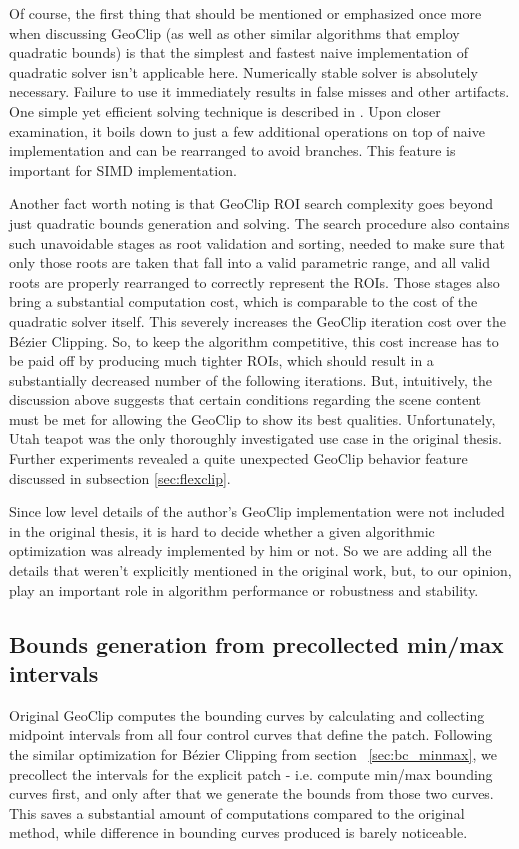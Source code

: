 \documentclass{jcgt}
\begin{document}
Of course, the first thing that should be mentioned or emphasized once more when discussing GeoClip (as well as other similar algorithms that employ quadratic bounds) is that the simplest and fastest naive implementation of quadratic solver isn't applicable here. Numerically stable solver is absolutely necessary. Failure to use it immediately results in false misses and other artifacts. One simple yet efficient solving technique is described in \cite{HornQuadratic}. Upon closer examination, it boils down to just a few additional operations on top of naive implementation and can be rearranged to avoid branches. This feature is important for SIMD implementation.

Another fact worth noting is that GeoClip ROI search complexity goes beyond just quadratic bounds generation and solving. The search procedure also contains such  unavoidable stages as root validation and sorting, needed to make sure that only those roots are taken that fall into a valid parametric range, and all valid roots are properly rearranged to correctly represent the ROIs. Those stages also bring a substantial computation cost, which is comparable to the cost of the quadratic solver itself. This severely increases the GeoClip iteration cost over the Bézier Clipping. So, to keep the algorithm competitive, this cost increase has to be paid off by producing much tighter ROIs, which should result in a substantially decreased number of the following iterations. But, intuitively, the discussion above suggests that certain conditions regarding the scene content must be met for allowing the GeoClip to show its best qualities.
Unfortunately, Utah teapot was the only thoroughly investigated use case in the original thesis. Further experiments revealed a quite unexpected GeoClip behavior feature discussed in subsection \ref{sec:flexclip}.

Since low level details of the author's GeoClip implementation were not included in the original thesis, it is hard to decide whether a given algorithmic optimization was already implemented by him or not. So we are adding all the details that weren't explicitly mentioned in the original work, but, to our opinion, play an important role in algorithm performance or robustness and stability.

\subsection{Bounds generation from precollected min/max intervals}
Original GeoClip computes the bounding curves by calculating and collecting midpoint intervals from all four control curves that define the patch.
Following the similar optimization for Bézier Clipping from section ~\ref{sec:bc_minmax}, we precollect the intervals for the explicit patch - i.e. compute min/max bounding curves first, and only after that we generate the bounds from those two curves.
This saves a substantial amount of computations compared to the original method, while difference in bounding curves produced is barely noticeable.
\end{document}
